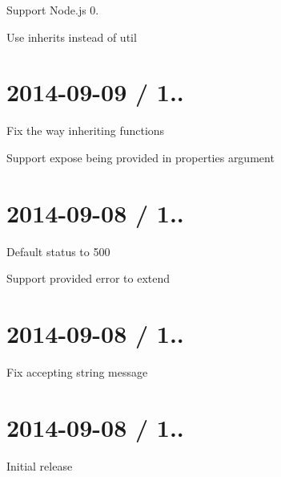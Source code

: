 \begin{DoxyItemize}
\item Support Node.\+js 0.
\item Use {\ttfamily inherits} instead of {\ttfamily util}
\end{DoxyItemize}

\section*{2014-\/09-\/09 / 1.. }


\begin{DoxyItemize}
\item Fix the way inheriting functions
\item Support {\ttfamily expose} being provided in properties argument
\end{DoxyItemize}

\section*{2014-\/09-\/08 / 1.. }


\begin{DoxyItemize}
\item Default status to 500
\item Support provided {\ttfamily error} to extend
\end{DoxyItemize}

\section*{2014-\/09-\/08 / 1.. }


\begin{DoxyItemize}
\item Fix accepting string message
\end{DoxyItemize}

\section*{2014-\/09-\/08 / 1.. }


\begin{DoxyItemize}
\item Initial release 
\end{DoxyItemize}